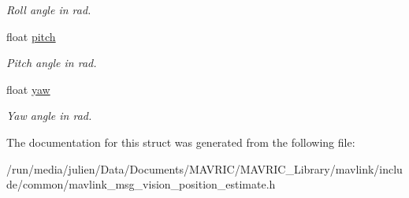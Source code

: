 \begin{DoxyCompactItemize}
\begin{DoxyCompactList}\small\item\em Roll angle in rad. \end{DoxyCompactList}\item 
\hypertarget{struct____mavlink__vision__position__estimate__t_aa07b146c1834dbd8f68a3ad45d07e657}{float \hyperlink{struct____mavlink__vision__position__estimate__t_aa07b146c1834dbd8f68a3ad45d07e657}{pitch}}\label{struct____mavlink__vision__position__estimate__t_aa07b146c1834dbd8f68a3ad45d07e657}

\begin{DoxyCompactList}\small\item\em Pitch angle in rad. \end{DoxyCompactList}\item 
\hypertarget{struct____mavlink__vision__position__estimate__t_a37749316a78f4f06f99fd36cd553f0a9}{float \hyperlink{struct____mavlink__vision__position__estimate__t_a37749316a78f4f06f99fd36cd553f0a9}{yaw}}\label{struct____mavlink__vision__position__estimate__t_a37749316a78f4f06f99fd36cd553f0a9}

\begin{DoxyCompactList}\small\item\em Yaw angle in rad. \end{DoxyCompactList}\end{DoxyCompactItemize}


The documentation for this struct was generated from the following file\+:\begin{DoxyCompactItemize}
\item 
/run/media/julien/\+Data/\+Documents/\+M\+A\+V\+R\+I\+C/\+M\+A\+V\+R\+I\+C\+\_\+\+Library/mavlink/include/common/mavlink\+\_\+msg\+\_\+vision\+\_\+position\+\_\+estimate.\+h\end{DoxyCompactItemize}
